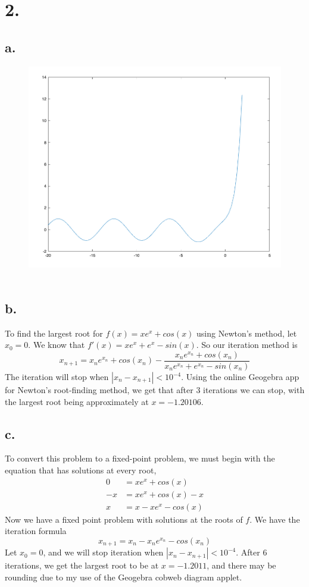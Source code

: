 \documentclass{article}
\begin{document}
\section*{2.}
\subsection*{a.}
\begin{figure}[h!]
	\includegraphics[scale=.3]{hw_5_matplot_graph_2}\
\end{figure}
\subsection*{b.}
To find the largest root for $f(x) = xe^x+cos(x)$ using Newton's method, let $x_0 = 0$. We know that $f'(x) = xe^x + e^x -sin(x)$. So our iteration method is 
\[ x_{n+1} = x_ne^{x_n}+cos(x_n) - \dfrac{x_ne^{x_n}+cos(x_n)}{x_ne^{x_n}+e^{x_n}-sin(x_n)}\]
The iteration will stop when $|x_n-x_{n+1}| < 10^{-4}$.
Using the online Geogebra app for Newton's root-finding method, we get that after 3 iterations we can stop, with the largest root being approximately at $x = -1.20106$.
\subsection*{c.}
To convert this problem to a fixed-point problem, we must begin with the equation that has solutions at every root,
\begin{align*}
0 &= xe^x + cos(x)\\
-x & = xe^x + cos(x) -x\\
x & = x-xe^x -cos(x)
\end{align*}
Now we have a fixed point problem with solutions at the roots of $f$. We have the iteration formula 
\[ x_{n+1} = x_n-x_ne^{x_n}-cos(x_n) \]
Let $x_0 = 0$, and we will stop iteration when $|x_n - x_{n+1}| < 10^{-4}$. After 6 iterations, we get the largest root to be at $x = -1.2011$, and there may be rounding due to my use of the Geogebra cobweb diagram applet.
\end{document}
